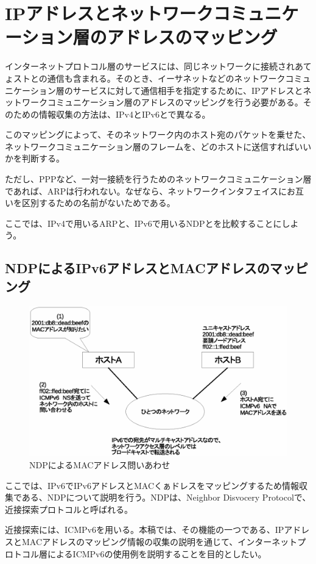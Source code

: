\section{IPアドレスとネットワークコミュニケーション層のアドレスのマッピング}

インターネットプロトコル層のサービスには、同じネットワークに接続されあてょストとの通信も含まれる。そのとき、イーサネットなどのネットワークコミュニケーション層のサービスに対して通信相手を指定するために、IPアドレスとネットワークコミュニケーション層のアドレスのマッピングを行う必要がある。そのための情報収集の方法は、IPv4とIPv6とで異なる。

このマッピングによって、そのネットワーク内のホスト宛のパケットを乗せた、ネットワークコミュニケーション層のフレームを、どのホストに送信すればいいかを判断する。

ただし、PPPなど、一対一接続を行うためのネットワークコミュニケーション層であれば、ARPは行われない。なぜなら、ネットワークインタフェイスにお互いを区別するための名前がないためである。

ここでは、IPv4で用いるARPと、IPv6で用いるNDPとを比較することにしよう。

\subsection{NDPによるIPv6アドレスとMACアドレスのマッピング}
\begin{figure}[htbp]
	\includegraphics[width=12cm,clip]{draw/ndp.eps}
	\caption{NDPによるMACアドレス問いあわせ}
	\label{fig:NDP}
\end{figure}

ここでは、IPv6でIPv6アドレスとMACくぁドレスをマッピングするため情報収集である、NDPについて説明を行う。NDPは、Neighbor Disvocery Protocolで、近接探索プロトコルと呼ばれる。

近接探索には、ICMPv6を用いる。本稿では、その機能の一つである、IPアドレスとMACアドレスのマッピング情報の収集の説明を通じて、インターネットプロトコル層によるICMPv6の使用例を説明することを目的としたい。

